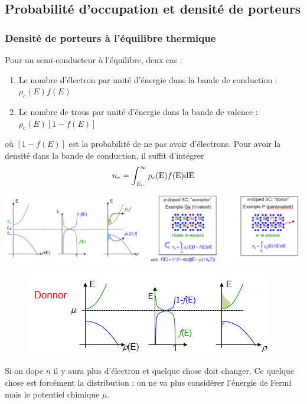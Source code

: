 	
	\subsection{Probabilité d'occupation et densité de porteurs}
		\subsubsection{Densité de porteurs à l'équilibre thermique}
		Pour un semi-conducteur à l'équilibre, deux cas :
		\begin{enumerate}
		\item Le nombre d'électron par unité d'énergie dans la bande de conduction : $\rho_c(E)f(E)$
		\item Le nombre de trous par unité d'énergie dans la bande de valence : $\rho_c(E)[1-f(E)]$		
		\end{enumerate}
		où $[1-f(E)]$ est la probabilité de ne pas avoir d'électrons. Pour avoir la densité dans la 
		bande de conduction, il suffit d'intégrer
		\begin{equation}
		{n_e} = \int_{{E_c}}^\infty  {{\rho _c}({\rm{E}})f({\rm{E}}){\rm{dE}}} 
		\end{equation}
			\begin{center}
	\includegraphics[scale=0.5]{ch5/image11}
	\end{center}
	
	\begin{figure}
	\vspace{-5mm}
	\includegraphics[scale=0.5]{ch5/image12}
	\end{figure}
	Si on dope $n$ il y aura plus d'électron et quelque chose doit changer. Ce quelque chose est
	forcément la distribution : on ne va plus considérer l'énergie de Fermi mais le potentiel 
	chimique $\mu$.
\newpage	
